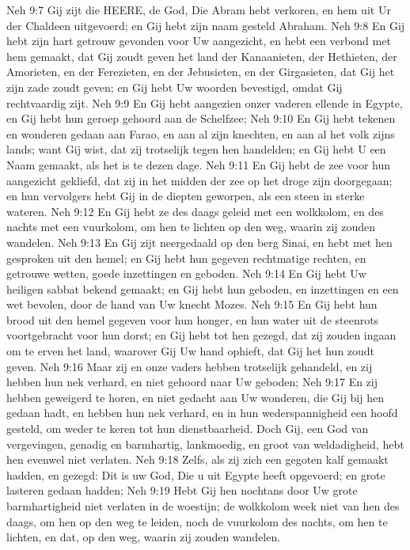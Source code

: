 Neh 9:7  Gij zijt die HEERE, de God, Die Abram hebt verkoren, en hem uit Ur der Chaldeen uitgevoerd; en Gij hebt zijn naam gesteld Abraham.
Neh 9:8  En Gij hebt zijn hart getrouw gevonden voor Uw aangezicht, en hebt een verbond met hem gemaakt, dat Gij zoudt geven het land der Kanaanieten, der Hethieten, der Amorieten, en der Ferezieten, en der Jebusieten, en der Girgasieten, dat Gij het zijn zade zoudt geven; en Gij hebt Uw woorden bevestigd, omdat Gij rechtvaardig zijt.
Neh 9:9  En Gij hebt aangezien onzer vaderen ellende in Egypte, en Gij hebt hun geroep gehoord aan de Schelfzee;
Neh 9:10  En Gij hebt tekenen en wonderen gedaan aan Farao, en aan al zijn knechten, en aan al het volk zijns lands; want Gij wist, dat zij trotselijk tegen hen handelden; en Gij hebt U een Naam gemaakt, als het is te dezen dage.
Neh 9:11  En Gij hebt de zee voor hun aangezicht gekliefd, dat zij in het midden der zee op het droge zijn doorgegaan; en hun vervolgers hebt Gij in de diepten geworpen, als een steen in sterke wateren.
Neh 9:12  En Gij hebt ze des daags geleid met een wolkkolom, en des nachts met een vuurkolom, om hen te lichten op den weg, waarin zij zouden wandelen.
Neh 9:13  En Gij zijt neergedaald op den berg Sinai, en hebt met hen gesproken uit den hemel; en Gij hebt hun gegeven rechtmatige rechten, en getrouwe wetten, goede inzettingen en geboden.
Neh 9:14  En Gij hebt Uw heiligen sabbat bekend gemaakt; en Gij hebt hun geboden, en inzettingen en een wet bevolen, door de hand van Uw knecht Mozes.
Neh 9:15  En Gij hebt hun brood uit den hemel gegeven voor hun honger, en hun water uit de steenrots voortgebracht voor hun dorst; en Gij hebt tot hen gezegd, dat zij zouden ingaan om te erven het land, waarover Gij Uw hand ophieft, dat Gij het hun zoudt geven.
Neh 9:16  Maar zij en onze vaders hebben trotselijk gehandeld, en zij hebben hun nek verhard, en niet gehoord naar Uw geboden;
Neh 9:17  En zij hebben geweigerd te horen, en niet gedacht aan Uw wonderen, die Gij bij hen gedaan hadt, en hebben hun nek verhard, en in hun wederspannigheid een hoofd gesteld, om weder te keren tot hun dienstbaarheid. Doch Gij, een God van vergevingen, genadig en barmhartig, lankmoedig, en groot van weldadigheid, hebt hen evenwel niet verlaten.
Neh 9:18  Zelfs, als zij zich een gegoten kalf gemaakt hadden, en gezegd: Dit is uw God, Die u uit Egypte heeft opgevoerd; en grote lasteren gedaan hadden;
Neh 9:19  Hebt Gij hen nochtans door Uw grote barmhartigheid niet verlaten in de woestijn; de wolkkolom week niet van hen des daags, om hen op den weg te leiden, noch de vuurkolom des nachts, om hen te lichten, en dat, op den weg, waarin zij zouden wandelen.
